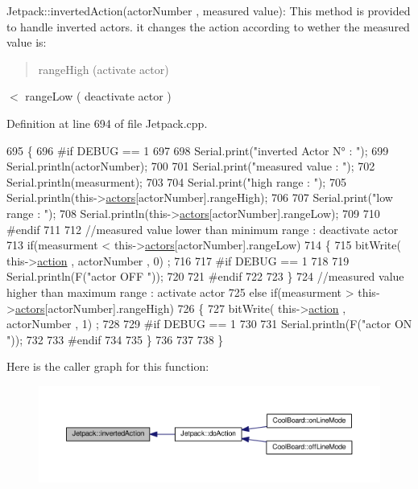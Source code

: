 Jetpack\+::inverted\+Action(actor\+Number , measured value)\+: This method is provided to handle inverted actors. it changes the action according to wether the measured value is\+: \begin{quote}
range\+High (activate actor) \end{quote}
$<$ range\+Low ( deactivate actor ) 

Definition at line 694 of file Jetpack.\+cpp.


\begin{DoxyCode}
695 \{
696 \textcolor{preprocessor}{#if DEBUG == 1}
697     
698     Serial.print(\textcolor{stringliteral}{"inverted Actor N° : "});
699     Serial.println(actorNumber);
700 
701     Serial.print(\textcolor{stringliteral}{"measured value : "});
702     Serial.println(measurment);
703 
704     Serial.print(\textcolor{stringliteral}{"high range : "});
705     Serial.println(this->\hyperlink{class_jetpack_a7e16d2f97837f9712a2e6de1c50d99db}{actors}[actorNumber].rangeHigh);
706 
707     Serial.print(\textcolor{stringliteral}{"low range : "});
708     Serial.println(this->\hyperlink{class_jetpack_a7e16d2f97837f9712a2e6de1c50d99db}{actors}[actorNumber].rangeLow);
709 
710 \textcolor{preprocessor}{#endif}
711 
712     \textcolor{comment}{//measured value lower than minimum range : deactivate actor}
713     \textcolor{keywordflow}{if}(measurment < this->\hyperlink{class_jetpack_a7e16d2f97837f9712a2e6de1c50d99db}{actors}[actorNumber].rangeLow)
714     \{
715         bitWrite( this->\hyperlink{class_jetpack_aca3142925a7b0834b34ae91d26af7765}{action} , actorNumber , 0) ;
716 
717 \textcolor{preprocessor}{    #if DEBUG == 1 }
718 
719         Serial.println(F(\textcolor{stringliteral}{"actor OFF "}));
720     
721 \textcolor{preprocessor}{    #endif}
722 
723     \}
724     \textcolor{comment}{//measured value higher than maximum range : activate actor}
725     \textcolor{keywordflow}{else} \textcolor{keywordflow}{if}(measurment > this->\hyperlink{class_jetpack_a7e16d2f97837f9712a2e6de1c50d99db}{actors}[actorNumber].rangeHigh)
726     \{
727         bitWrite( this->\hyperlink{class_jetpack_aca3142925a7b0834b34ae91d26af7765}{action} , actorNumber , 1) ;
728 
729 \textcolor{preprocessor}{    #if DEBUG == 1 }
730 
731         Serial.println(F(\textcolor{stringliteral}{"actor ON "}));
732     
733 \textcolor{preprocessor}{    #endif}
734 
735     \}
736 
737 
738 \}
\end{DoxyCode}
Here is the caller graph for this function\+:\nopagebreak
\begin{figure}[H]
\begin{center}
\leavevmode
\includegraphics[width=350pt]{df/d1d/class_jetpack_adacfc35fab4a621357caf98ce1c9cb54_icgraph}
\end{center}
\end{figure}
